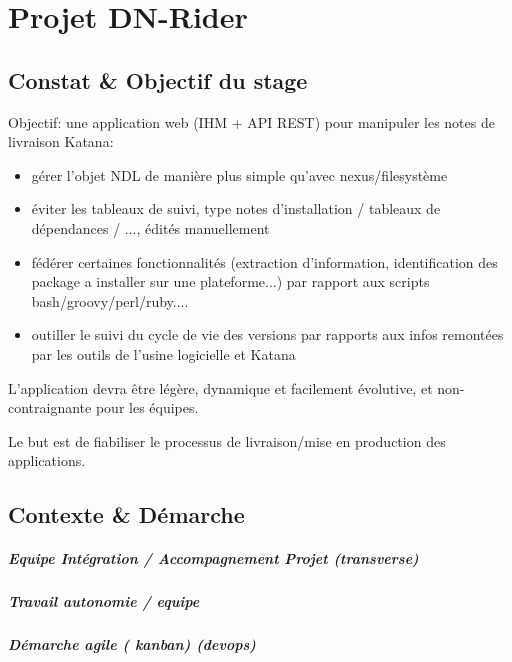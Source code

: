 \chapter{Projet DN-Rider}
\label{chap:Projet DN-Rider}

\section{Constat \& Objectif du stage}


Objectif: une application web (IHM + API REST) pour manipuler les notes de livraison Katana:

\begin{itemize}
  \item gérer l'objet NDL de manière plus simple qu'avec nexus/filesystème
  \item éviter les tableaux de suivi, type notes d'installation / tableaux de dépendances / ..., édités manuellement
  \item fédérer certaines fonctionnalités (extraction d'information, identification des package a installer sur une plateforme...) par rapport aux scripts bash/groovy/perl/ruby....
  \item  outiller le suivi du cycle de vie des versions par rapports aux infos remontées par les outils de l'usine logicielle et Katana
\end{itemize}

L’application devra être légère, dynamique et facilement évolutive, et non-contraignante pour les équipes.

Le but est de fiabiliser le processus de livraison/mise en production des applications.
\clearpage

\section{Contexte \& Démarche}
\paragraph{Equipe Intégration / Accompagnement Projet (transverse)}
\paragraph{Travail autonomie / equipe}
\paragraph{Démarche agile ( kanban) (devops)}

